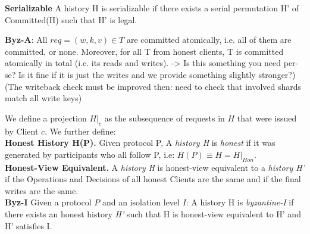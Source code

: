 \textbf{Serializable} 
A history H is serializable if there exists a serial permutation H' of Committed(H) such that H' is legal.

\textbf{Byz-A}: All $req = (w, k, v) \in T$ are committed atomically, i.e. all of them are committed, or none. Moreover, for all T from honest clients, T is committed atomically in total (i.e. its reads and writes). -> Is this something you need per-se? Is it fine if it is just the writes and we provide something slightly stronger?)
(The writeback check must be improved then: need to check that involved shards match all write keys)

\iffalse
\textbf{History H.} We define a \textit{history H} as a finite sequence of requests. Informally, a \textit{H} contains the operations (read/write) and decisions (commit/abort) of every transaction issued in the system.

We define a projection $H|_c$ as the subsequence of requests in $H$ that were issued by Client $c$. A sequence of requests $s = req_i \dots req_{i+t}$ in $H|_c$ form a \textit{Transaction} if $req_i$ is the first request by Client $c$ or $req_{i-1} \in Dec \times c$, and if $req_{i+t} \in Dec \times c$. Let $Committed(H)$ be the subsequence of all Transactions with $req_{i+t} = Commit$. A History H is legal if every read request $(r, k, v)$ is preceded by a matching write request $(w, k, v)$ and there is no other write $(w, k, v')$ inbetween.\\
\textbf{Serializable}  
A history H is serializable if there exists a serial permutation H' of Committed(H) such that H' is legal.
\fi

We define a projection $H|_c$ as the subsequence of requests in $H$ that were issued by Client $c$.
We further define:\\
\textbf{Honest History H(P).} Given protocol P, A \textit{history H} is \textit{honest} if it was generated by participants who all follow P, i.e: $H(P) \equiv H = H|_{Hon}$.\\
\textbf{Honest-View Equivalent.} A \textit{history H} is honest-view equivalent to a \textit{history H'} if the Operations and Decisions of all honest Clients are the same and if the final writes are the same.\\
\textbf{Byz-I} Given a protocol $P$ and an isolation level $I$:
A history H is \textit{byzantine-I} if there exists an honest history \textit{H'} such that H is honest-view equivalent to H' and H' satisfies I. \\

